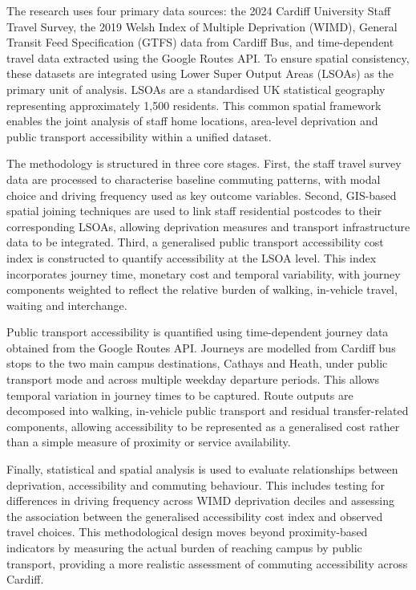 \documentclass[11pt,a4paper]{article}
\begin{document}
The research uses four primary data sources: the 2024 Cardiff University Staff Travel Survey, the 2019 Welsh Index of Multiple Deprivation (WIMD), General Transit Feed Specification (GTFS) data from Cardiff Bus, and time-dependent travel data extracted using the Google Routes API. To ensure spatial consistency, these datasets are integrated using Lower Super Output Areas (LSOAs) as the primary unit of analysis. LSOAs are a standardised UK statistical geography representing approximately 1,500 residents. This common spatial framework enables the joint analysis of staff home locations, area-level deprivation and public transport accessibility within a unified dataset.

The methodology is structured in three core stages. First, the staff travel survey data are processed to characterise baseline commuting patterns, with modal choice and driving frequency used as key outcome variables. Second, GIS-based spatial joining techniques are used to link staff residential postcodes to their corresponding LSOAs, allowing deprivation measures and transport infrastructure data to be integrated. Third, a generalised public transport accessibility cost index is constructed to quantify accessibility at the LSOA level. This index incorporates journey time, monetary cost and temporal variability, with journey components weighted to reflect the relative burden of walking, in-vehicle travel, waiting and interchange.

Public transport accessibility is quantified using time-dependent journey data obtained from the Google Routes API. Journeys are modelled from Cardiff bus stops to the two main campus destinations, Cathays and Heath, under public transport mode and across multiple weekday departure periods. This allows temporal variation in journey times to be captured. Route outputs are decomposed into walking, in-vehicle public transport and residual transfer-related components, allowing accessibility to be represented as a generalised cost rather than a simple measure of proximity or service availability.

Finally, statistical and spatial analysis is used to evaluate relationships between deprivation, accessibility and commuting behaviour. This includes testing for differences in driving frequency across WIMD deprivation deciles and assessing the association between the generalised accessibility cost index and observed travel choices. This methodological design moves beyond proximity-based indicators by measuring the actual burden of reaching campus by public transport, providing a more realistic assessment of commuting accessibility across Cardiff.
\end{document}
